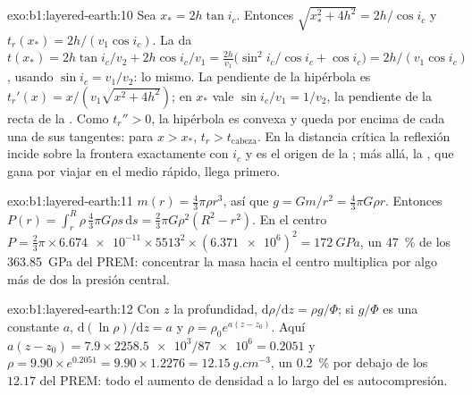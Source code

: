 \begin{solution}{exo:b1:layered-earth:10}
Sea $x_* = 2h\tan i_c$. Entonces $\sqrt{x_*^2 + 4h^2} = 2h/\cos i_c$ y $t_r(x_*) = 2h/(v_1\cos i_c)$. La  da
$t(x_*) = 2h\tan i_c/v_2 + 2h\cos i_c/v_1 = \frac{2h}{v_1}\bigl(\sin^2 i_c/\cos
i_c + \cos i_c\bigr) = 2h/(v_1\cos i_c)$, usando $\sin i_c = v_1/v_2$: lo mismo.
La pendiente de la hipérbola es $t_r'(x) = x/(v_1\sqrt{x^2 + 4h^2})$; en $x_*$ vale
$\sin i_c/v_1 = 1/v_2$, la pendiente de la recta de la . Como
$t_r'' > 0$, la hipérbola es convexa y queda por encima de cada una de sus tangentes: para
$x > x_*$, $t_r > t_{\text{cabeza}}$. En la distancia crítica la reflexión incide sobre la frontera exactamente con $i_c$ y es el
origen de la ; más allá, la , que gana por viajar en el medio rápido, llega primero.
\end{solution}

\begin{solution}{exo:b1:layered-earth:11}
$m(r) = \tfrac43\pi\rho r^3$, así que $g = Gm/r^2 = \tfrac43\pi G\rho r$. Entonces
$P(r) = \int_r^R \rho\,\tfrac43\pi G\rho s\,\mathrm ds = \tfrac23\pi G\rho^2(R^2
- r^2)$. En el centro $P = \tfrac23\pi\times\num{6.674e-11}\times5513^2\times
(\num{6.371e6})^2 = \qty{172}{GPa}$, un \qty{47}{\percent} de los
\qty{363.85}{GPa} del PREM: concentrar la masa hacia el centro multiplica por algo más de dos la presión central.
\end{solution}

\begin{solution}{exo:b1:layered-earth:12}
Con $z$ la profundidad, $\mathrm d\rho/\mathrm dz = \rho g/\Phi$; si $g/\Phi$ es una constante $a$,
$\mathrm d(\ln\rho)/\mathrm dz = a$ y $\rho = \rho_0
e^{a(z - z_0)}$. Aquí $a(z - z_0) = 7.9\times\num{2258.5e3}/\num{87e6} =
0.2051$ y $\rho = 9.90\times e^{0.2051} = 9.90\times1.2276 =
\qty{12.15}{g.cm^{-3}}$, un \qty{0.2}{\percent} por debajo de los
$12.17$ del PREM: todo el aumento de densidad a lo largo del  es autocompresión.
\end{solution}

